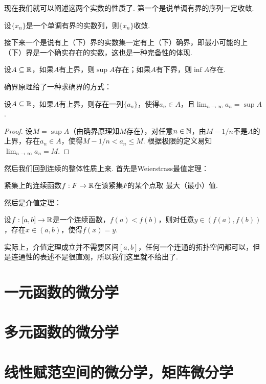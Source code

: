 现在我们就可以阐述这两个实数的性质了. 第一个是说单调有界的序列一定收敛. 

\begin{proposition}[单调有界原理]\label{prop:monotone-bounded}
    设$\{x_n\}$是一个单调有界的实数列，则$\{x_n\}$收敛. 
\end{proposition}

接下来一个是说有上（下）界的实数集一定有上（下）确界，即最小可能的上（下）界是一个确实存在的实数，这也是一种完备性的体现. 
\begin{proposition}[确界原理]\label{prop:supremum}
    设$A\subseteq\mathbb{R}$，如果$A$有上界，则$\sup A$存在；如果$A$有下界，则$\inf A$存在. 
\end{proposition}

确界原理给了一种求确界的方式：
\begin{proposition}\label{prop:supremum-epsilon}
    设$A\subseteq\mathbb{R}$，如果$A$有上界，则存在一列$\{a_n\}$，使得$a_n\in A$，且$\lim_{n\to\infty}a_n=\sup A$.
\end{proposition}
\begin{proof}
    设$M=\sup A$（由确界原理知$M$存在），对任意$n\in\mathbb{N}$，由$M-1/n$不是$A$的上界，存在$a_n\in A$，使得$M-1/n<a_n\leq M$. 根据极限的定义易知$\lim_{n\to\infty}a_n=M$.
\end{proof}

然后我们回到连续的整体性质上来. 首先是Weierstrass最值定理：

\begin{theorem}[Weierstrass最值定理]\label{thm:weierstrass}
    紧集上的连续函数$f:F\to\mathbb{R}$在该紧集$F$的某个点取 最大（最小）值. 
\end{theorem}

然后是介值定理：
\begin{theorem}[介值定理]\label{thm:intermediate}
    设$f:[a,b]\to\mathbb{R}$是一个连续函数，$f(a)<f(b)$，则对任意$y\in(f(a),f(b))$，存在$x\in(a,b)$，使得$f(x)=y$.
\end{theorem}
实际上，介值定理成立并不需要区间$[a,b]$，任何一个连通的拓扑空间都可以，但是连通性的表述不是很直观，所以我们这里就不给出了. 



\section{一元函数的微分学}

\section{多元函数的微分学}

\section{线性赋范空间的微分学，矩阵微分学}
